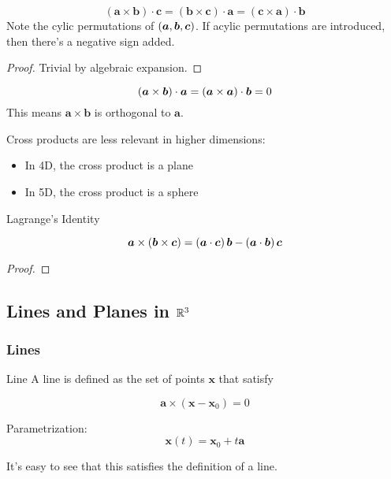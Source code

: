 \documentclass[11pt]{article}
\begin{document}
\begin{theorem}
  
  $$
  (\bm{a} \times \bm{b}) \cdot \bm{c} = (\bm{b} \times \bm{c}) \cdot \bm{a} = (\bm{c} \times \bm{a} ) \cdot \bm{b}
  $$
  Note the cylic permutations of $\left ( \bm{a}, \bm{b}, \bm{c} \right)$.
  If acylic permutations are introduced, then there's a negative sign added.
  
  \begin{proof}
    Trivial by algebraic expansion.
  \end{proof}
  
\end{theorem}

\begin{example}

  $$ (\bm{a} \times \bm{b}) \cdot \bm{a} = \left (  \bm{a} \times \bm{a} \right) \cdot \bm{b} = 0$$
  This means $\bm{a} \times \bm{b}$ is orthogonal to $\bm{a}$.
  
\end{example}

Cross products are less relevant in higher dimensions:
\begin{itemize}
\item In 4D, the cross product is a plane
\item In 5D, the cross product is a sphere
\end{itemize}



\begin{theorem}{Lagrange's Identity}
  
  $$
  \bm{a} \times \left ( \bm{b} \times \bm{c}  \right) = \left ( \bm{a} \cdot \bm{c} \right) \bm{b} - \left ( \bm{a} \cdot \bm{b} \right) \bm{c}  $$

    

  \begin{proof}
    
  \end{proof}
\end{theorem}

\subsection{Lines and Planes in $\mathbb R^3$}

\subsubsection{Lines}

\begin{definition}{Line}
  A line is defined as the set of points $\bm{x}$ that satisfy
  
  $$
  \bm{a} \times ( \bm{x} - \bm{x}_0) = 0
  $$

  Parametrization:
  $$\bm{x}(t) = \bm{x}_0 + t \bm{a}$$

  It's easy to see that this satisfies the definition of a line.
\end{definition}
\end{document}
